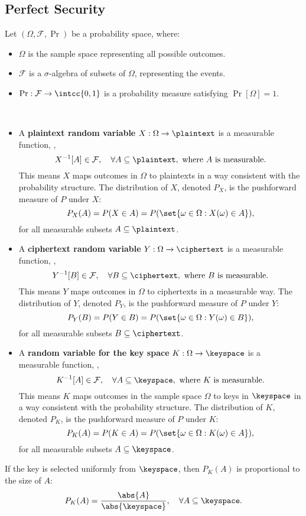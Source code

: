 \subsection{Perfect Security}
\begin{note}
Let $(\Omega,\mathcal{F}, \Pr)$ be a probability space, where: \begin{itemize}
	\item $\Omega$ is the sample space representing all possible outcomes.
	\item $\mathcal{F}$ is a $\sigma$-algebra of subsets of $\Omega$, representing the events.
	\item $\Pr:\mathcal{F}\to\intcc{0,1}$ is a probability measure satisfying $\Pr[\Omega]=1$.
\end{itemize}
\end{note}
\begin{note}
\ \begin{itemize}
	\item A \textbf{plaintext random variable} $X:\Omega\to\plaintext$ is a measurable function, \ie, \[
	X^{-1}[A]\in\mathcal{F},\quad\forall A\subseteq\plaintext,\ \text{where $A$ is measurable}.
	\] This means $X$ maps outcomes in $\Omega$ to plaintexts in a way consistent with the probability structure. The distribution of $X$, denoted $P_X$, is the pushforward measure of $P$ under $X$:
	\[P_X(A)=P(X\in A)=P(\set{\omega\in\Omega:X(\omega)\in A}),\]
	for all measurable subsets $A\subseteq\plaintext$.	
	\item A \textbf{ciphertext random variable} $Y:\Omega\to\ciphertext$ is a measurable function, \ie, \[
	Y^{-1}[B]\in\mathcal{F},\quad\forall B\subseteq\ciphertext,\ \text{where $B$ is measurable}.
	\] This means $Y$ maps outcomes in $\Omega$ to ciphertexts in a measurable way. The distribution of $Y$, denoted $P_Y$, is the pushforward measure of $P$ under $Y$:
	\[P_Y(B)=P(Y\in B)=P(\set{\omega\in\Omega:Y(\omega)\in B}),\]
	for all measurable subsets $B\subseteq\ciphertext$.	
	\item A \textbf{random variable for the key space} $K:\Omega\to\keyspace$ is a measurable function, \ie, \[
	K^{-1}[A]\in\mathcal{F},\quad\forall A\subseteq\keyspace,\ \text{where $K$ is measurable}.
	\] This means $K$ maps outcomes in the sample space $\Omega$ to keys in 
	$\keyspace$ in a way consistent with the probability structure. The distribution of $K$, denoted $P_K$, is the pushforward measure of $P$ under $K$:
	\[P_K(A)=P(K\in A)=P(\set{\omega\in\Omega:K(\omega)\in A}),\]
	for all measurable subsets $A\subseteq\keyspace$.	
\end{itemize}
\end{note}
\begin{note}
	If the key is selected uniformly from $\keyspace$, then $P_K(A)$ is proportional to the size of $A$: \[
	P_K(A)=\frac{\abs{A}}{\abs{\keyspace}},\quad\forall A\subseteq\keyspace.
	\]
\end{note}

